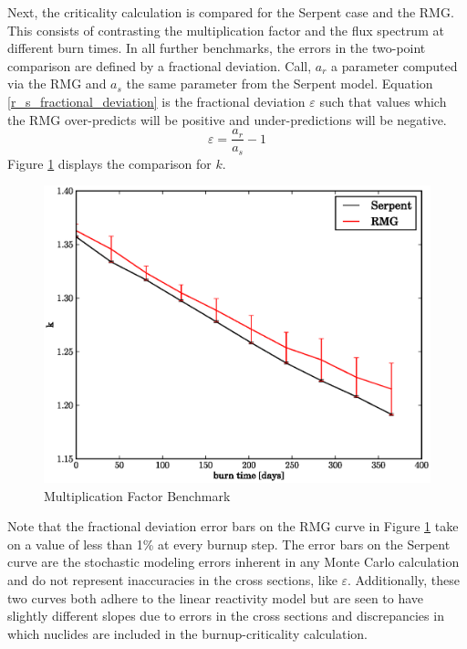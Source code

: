 Next, the criticality calculation is compared for the Serpent case and the RMG.  This consists of 
contrasting the multiplication factor and the flux spectrum at different burn times.  In all further
benchmarks, the errors in the two-point comparison are defined by a fractional deviation.  Call, $a_r$ 
a parameter computed via the RMG and $a_s$ the same parameter from the Serpent model.  Equation 
\ref{r_s_fractional_deviation} is the fractional deviation $\varepsilon$ such that values which the RMG
over-predicts will be positive and under-predictions will be negative.
\begin{equation}
\label{r_s_fractional_deviation}
\varepsilon = \frac{a_r}{a_s} - 1
\end{equation}
Figure \ref{k_compare} displays the comparison for $k$.  
\begin{figure}[htbp]
\caption{Multiplication Factor Benchmark}
\label{k_compare}
\begin{center}
\includegraphics[scale=0.5]{multigroup_method/figs/benchmark/k.eps}
\end{center}
\end{figure}
Note that the fractional deviation error bars on the RMG curve in Figure \ref{k_compare} 
take on a value of less than 1\% at every burnup step.  
The error bars on the Serpent curve are the stochastic modeling errors inherent in any Monte
Carlo calculation and do not represent inaccuracies in the cross sections, like $\varepsilon$.
Additionally, these two curves both adhere to the linear reactivity model but are seen to have slightly 
different slopes due to errors in the cross sections and discrepancies in which nuclides are included in 
the burnup-criticality calculation.

